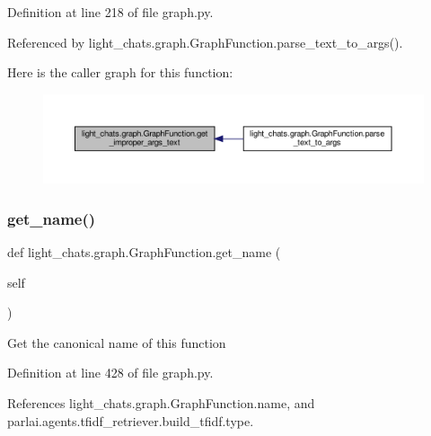 Definition at line 218 of file graph.\+py.



Referenced by light\+\_\+chats.\+graph.\+Graph\+Function.\+parse\+\_\+text\+\_\+to\+\_\+args().

Here is the caller graph for this function\+:
\nopagebreak
\begin{figure}[H]
\begin{center}
\leavevmode
\includegraphics[width=350pt]{classlight__chats_1_1graph_1_1GraphFunction_a4ffab7ed0e956a6bc76e3f61818ab5ff_icgraph}
\end{center}
\end{figure}
\mbox{\label{classlight__chats_1_1graph_1_1GraphFunction_a6fb123ff0ec87dde23a5ce8a1614bbbe}} 
\subsubsection{\texorpdfstring{get\+\_\+name()}{get\_name()}}
{\footnotesize\ttfamily def light\+\_\+chats.\+graph.\+Graph\+Function.\+get\+\_\+name (\begin{DoxyParamCaption}\item[{}]{self }\end{DoxyParamCaption})}

\begin{DoxyVerb}Get the canonical name of this function\end{DoxyVerb}
 

Definition at line 428 of file graph.\+py.



References light\+\_\+chats.\+graph.\+Graph\+Function.\+name, and parlai.\+agents.\+tfidf\+\_\+retriever.\+build\+\_\+tfidf.\+type.



